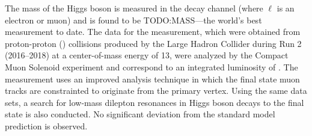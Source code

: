 % 
The mass of the Higgs boson is measured in the \hzzfourl decay channel (where $\ell$ is an electron or muon) and is found to be TODO:MASS---the world's best measurement to date. 
The data for the measurement, which were obtained from proton-proton (\pp) collisions produced by the Large Hadron Collider during Run 2 (2016--2018) at a center-of-mass energy of 13\TeV, were analyzed by the Compact Muon Solenoid experiment and correspond to an integrated luminosity of \lumiruntwo.
The measurement uses an improved analysis technique in which the final state muon tracks are constrainted to originate from the primary \pp vertex.
Using the same data sets, a search for low-mass dilepton resonances in Higgs boson decays to the \fourl final state is also conducted.
No significant deviation from the standard model prediction is observed.

